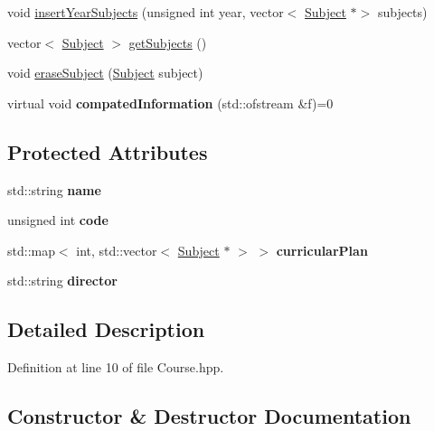 \begin{DoxyCompactItemize}
void \hyperlink{classCourse_ac0ce13dcddfd17ccbd9606d0033aa713}{insert\+Year\+Subjects} (unsigned int year, vector$<$ \hyperlink{classSubject}{Subject} $\ast$$>$ subjects)
\item 
vector$<$ \hyperlink{classSubject}{Subject} $>$ \hyperlink{classCourse_a69d1fb52aa6c36851e0f6a8a5383de3d}{get\+Subjects} ()
\item 
void \hyperlink{classCourse_aa9b7e96bbf7689fe1b62d35b16bdc74f}{erase\+Subject} (\hyperlink{classSubject}{Subject} subject)
\item 
\mbox{\label{classCourse_a43d77e0dd54f02a5e8a4e1840a669f9d}} 
virtual void {\bfseries compated\+Information} (std\+::ofstream \&f)=0
\end{DoxyCompactItemize}
\subsection*{Protected Attributes}
\begin{DoxyCompactItemize}
\item 
\mbox{\label{classCourse_ab5286ae7c73c3dd66c3a99f630c17c0a}} 
std\+::string {\bfseries name}
\item 
\mbox{\label{classCourse_a04d959210c3d7a4fbb4a66c260419c6d}} 
unsigned int {\bfseries code}
\item 
\mbox{\label{classCourse_a5df6b76f92fe29c6521262afc4214103}} 
std\+::map$<$ int, std\+::vector$<$ \hyperlink{classSubject}{Subject} $\ast$ $>$ $>$ {\bfseries curricular\+Plan}
\item 
\mbox{\label{classCourse_a07f2b89a7c5e9667651671f41f8e1219}} 
std\+::string {\bfseries director}
\end{DoxyCompactItemize}


\subsection{Detailed Description}


Definition at line 10 of file Course.\+hpp.



\subsection{Constructor \& Destructor Documentation}
\mbox{\label{classCourse_a0caa544c52f7d2c69640be093d40f90b}} 

